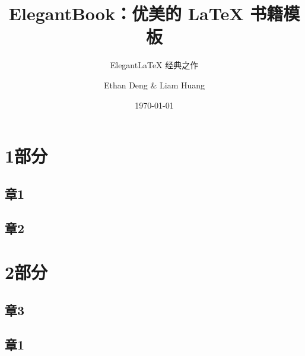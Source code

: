 \documentclass[cn,11pt,onecol,color=black]{elegantbook}
\title{ElegantBook：优美的 \LaTeX{} 书籍模板}
\subtitle{Elegant\LaTeX{} 经典之作}
\author{Ethan Deng \& Liam Huang}
\institute{Elegant\LaTeX{} Program}
\date{\today}
\begin{document}
\maketitle
\tableofcontents
\mainmatter
\hypersetup{pageanchor=true}
\part{1部分}
\chapter{章1}
\chapter{章2}
\part{2部分}
\chapter{章3}
\chapter{章1}
\end{document}
